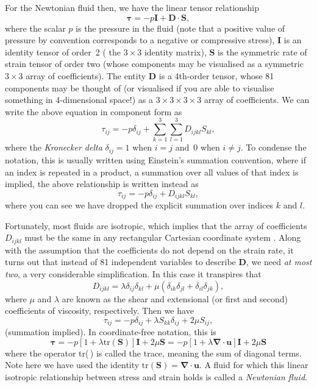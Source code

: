 \documentclass[twoside,11pt]		{report}
\begin{document}
For the Newtonian fluid then, we have the linear tensor relationship
\begin{equation}
\bm{\tau}=-p\bm{I} + \bm{D\cdot S},
\end{equation}
where the scalar $p$ is the pressure in the fluid (note that a
positive value of pressure by convention corresponds to a negative or
compressive stress), $\bm{I}$ is an identity tensor of order~2 (\ie
the $3\times3$ identity matrix), $\bm{S}$ is the symmetric rate of
strain tensor of order two (whose components may be visualised as a
symmetric $3\times3$ array of coefficients). The entity $\bm{D}$ is a
4th-order tensor, whose 81 components may be thought of (or visualised
if you are able to visualise something in 4-dimensional space!) as a
$3\times3\times3\times3$ array of coefficients. We can write the above
equation in component form as
\begin{equation}
\tau_{ij} = -p \delta_{ij} + \sum_{k=1}^3\sum_{l=1}^3 D_{ijkl}S_{kl},
\end{equation}
where the \emph{Kronecker delta} $\delta_{ij}=1$ when $i=j$ and~0 when
$i\ne j$. To condense the notation, this is usually written using
Einstein's summation convention, where if an index is repeated in a
product, a summation over all values of that index is implied, \ie the
above relationship is written instead as
\begin{equation}
\tau_{ij} = -p \delta_{ij} + D_{ijkl}S_{kl},
\end{equation}
where you can see we have dropped the explicit summation over indices
$k$ and $l$.

Fortunately, most fluids are isotropic, which implies that the array
of coefficients $D_{ijkl}$ must be the same in any rectangular
Cartesian coordinate system \citep[see e.g.][ch.~8]{fung69}. Along
with the assumption that the coefficients do not depend on the strain
rate, it turns out that instead of 81 independent variables to
describe $\bm{D}$, we need \emph{at most two}, a very considerable
simplification. In this case it transpires that
\begin{equation}
D_{ijkl} = \lambda \delta_{ij}\delta_{kl} +
 \mu\left(\delta_{ik}\delta_{jl} + \delta_{il}\delta_{jk}\right),
\end{equation}
where $\mu$ and $\lambda$ are known as the shear and extensional (or
first and second) coefficients of viscosity, respectively. Then we
have
\begin{equation}
\tau_{ij} = -p \delta_{ij} + \lambda S_{kk}\delta_{ij} + 2\mu S_{ij},
\end{equation}
(summation implied). In coordinate-free notation, this is
\begin{equation}
\bm{\tau} =
-p\left[1 + \lambda \mathrm{tr}(\bm{S})\right]\bm{I} + 2\mu\bm{S}=
-p\left[1 + \lambda \bm{\nabla\cdot u}\right]\bm{I} + 2\mu\bm{S}
\end{equation}
where the operator tr(\,) is called the trace, meaning the sum of
diagonal terms. Note here we have used the identity
$\mathrm{tr}(\bm{S})=\bm{\nabla\cdot u}$. A fluid for which this
linear isotropic relationship between stress and strain holds is called
a \emph{Newtonian fluid}. 
\end{document}
